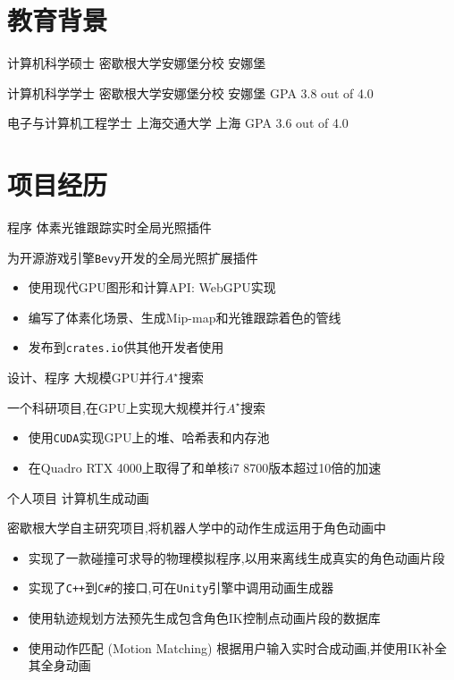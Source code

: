 \documentclass[10pt, a4paper, sans]{moderncv}
\title{}
\begin{document}
\makecvtitle

\section{教育背景}
{计算机科学硕士}
{密歇根大学安娜堡分校}
{安娜堡}
{}
{}

{计算机科学学士}
{密歇根大学安娜堡分校}
{安娜堡}
{GPA 3.8 out of 4.0}
{}

{电子与计算机工程学士}
{上海交通大学}
{上海}
{GPA 3.6 out of 4.0}
{}

\section{项目经历}
{程序}
{体素光锥跟踪实时全局光照插件}{}{}
{
	为开源游戏引擎\texttt{Bevy}开发的全局光照扩展插件
	\begin{itemize}
		\item 使用现代GPU图形和计算API: WebGPU实现
		\item 编写了体素化场景、生成Mip-map和光锥跟踪着色的管线
		\item 发布到\texttt{crates.io}供其他开发者使用
	\end{itemize}
}

{设计、程序}
{大规模GPU并行$A^\star$搜索}{}{}
{
	一个科研项目,在GPU上实现大规模并行$A^\star$搜索
	\begin{itemize}
		\item 使用\texttt{CUDA}实现GPU上的堆、哈希表和内存池
		\item 在Quadro RTX 4000上取得了和单核i7 8700版本超过10倍的加速
	\end{itemize}
}
{个人项目}
{计算机生成动画}
{}{}
{密歇根大学自主研究项目,将机器人学中的动作生成运用于角色动画中
	\begin{itemize}
		\item 实现了一款碰撞可求导的物理模拟程序,以用来离线生成真实的角色动画片段
		\item 实现了\texttt{C++}到\texttt{C\#}的接口,可在\texttt{Unity}引擎中调用动画生成器
		\item 使用轨迹规划方法预先生成包含角色IK控制点动画片段的数据库
		\item 使用动作匹配 (Motion Matching) 根据用户输入实时合成动画,并使用IK补全其全身动画
	\end{itemize}
}
\end{document}
